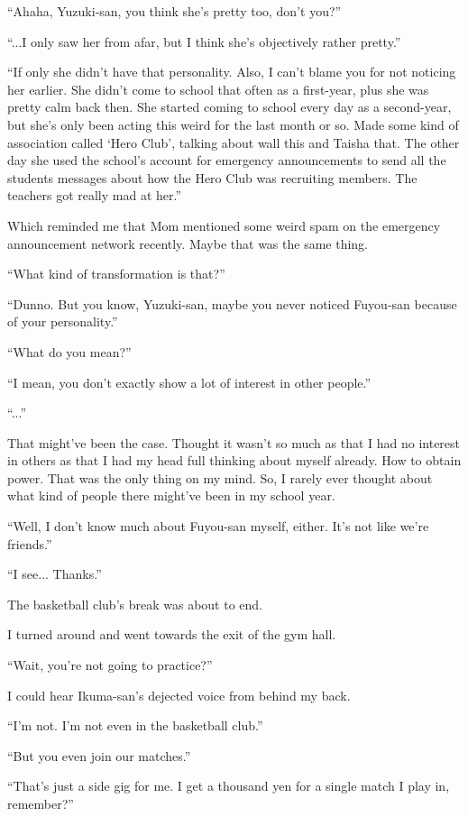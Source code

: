 ``Ahaha, Yuzuki-san, you think she's pretty too, don't you?''

``...I only saw her from afar, but I think she's objectively rather pretty.''

``If only she didn't have that personality. Also, I can't blame you for not noticing her earlier. She didn't come to school that often as a first-year, plus she was pretty calm back then. She started coming to school every day as a second-year, but she's only been acting this weird for the last month or so. Made some kind of association called `Hero Club', talking about wall this and Taisha that. The other day she used the school's account for emergency announcements to send all the students messages about how the Hero Club was recruiting members. The teachers got really mad at her.''

Which reminded me that Mom mentioned some weird spam on the emergency announcement network recently. Maybe that was the same thing.

``What kind of transformation is that?''

``Dunno. But you know, Yuzuki-san, maybe you never noticed Fuyou-san because of your personality.''

``What do you mean?''

``I mean, you don't exactly show a lot of interest in other people.''

``...''

That might've been the case. Thought it wasn't so much as that I had no interest in others as that I had my head full thinking about myself already. How to obtain power. That was the only thing on my mind. So, I rarely ever thought about what kind of people there might've been in my school year.

``Well, I don't know much about Fuyou-san myself, either. It's not like we're friends.''

``I see... Thanks.''

The basketball club's break was about to end.

I turned around and went towards the exit of the gym hall.

``Wait, you're not going to practice?''

I could hear Ikuma-san's dejected voice from behind my back.

``I'm not. I'm not even in the basketball club.''

``But you even join our matches.''

``That's just a side gig for me. I get a thousand yen for a single match I play in, remember?''

